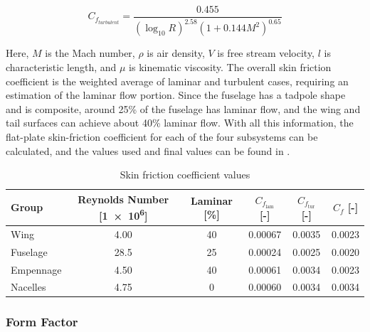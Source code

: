 \begin{equation}
    C_{f_{turbulent}} = \frac{0.455}{(\log_{10}R)^{2.58} (1+0.144M^2)^{0.65}}
\end{equation}

Here, $M$ is the Mach number, $\rho$ is air density, $V$ is free stream velocity, $l$ is characteristic length, and $\mu$ is kinematic viscosity.
The overall skin friction coefficient is the weighted average of laminar and turbulent cases, requiring an estimation of the laminar flow portion.
Since the fuselage has a tadpole shape and is composite, around 25\% of the fuselage has laminar flow, and the wing and tail surfaces can achieve about 40\% laminar flow.
With all this information, the flat-plate skin-friction coefficient for each of the four subsystems can be calculated, and the values used and final values can be found in .

\begin{table}[H]
    \centering
    \caption{Skin friction coefficient values}
    \label{tab:Skin-Friction_coefficient}
    \begin{tabular}{
        l|
        S[table-format=2.2]
        S[table-format=2]
        S[table-format=1.5, parse-numbers=false]
        S[table-format=1.4, parse-numbers=false]
        S[table-format=1.4, parse-numbers=false]
    }
        \toprule
        \textbf{Group}       & \textbf{Reynolds Number} [\num{1e6}]  & \textbf{Laminar} [\unit{\%}] & \textbf{$C_{f_\text{lam}}$} [{-}] & \textbf{$C_{f_\text{tur}}$} [{-}] & \textbf{$C_f$} [{-}] \\ \midrule
        Wing        & 4.00                  &  40        & 0.00067      & 0.0035 & 0.0023         \\
        Fuselage    & 28.5               &  25        & 0.00024      & 0.0025 & 0.0020          \\
        Empennage   & 4.50                &  40        & 0.00061      & 0.0034 & 0.0023          \\
        Nacelles    & 4.75               &  0         & 0.00060      & 0.0034 & 0.0034 \\
        \bottomrule
    \end{tabular}
\end{table}

\subsubsection{Form Factor}

